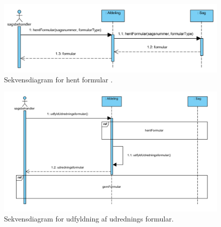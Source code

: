 \begin{figure}[hbt!]
  \includegraphics[width=\linewidth]{./PNG/sekDiaHentFormular.PNG} 
  \caption{Sekvensdiagram for hent formular .}
  \label{fig:HentForm}
\end{figure}
\newpage
\begin{figure}[hbt!]
  \includegraphics[width=\linewidth]{./PNG/sekDiaUdfyldUdredningsFormular.PNG} 
  \caption{Sekvensdiagram for udfyldning af udrednings formular.}
  \label{fig:UdForm}
\end{figure}

